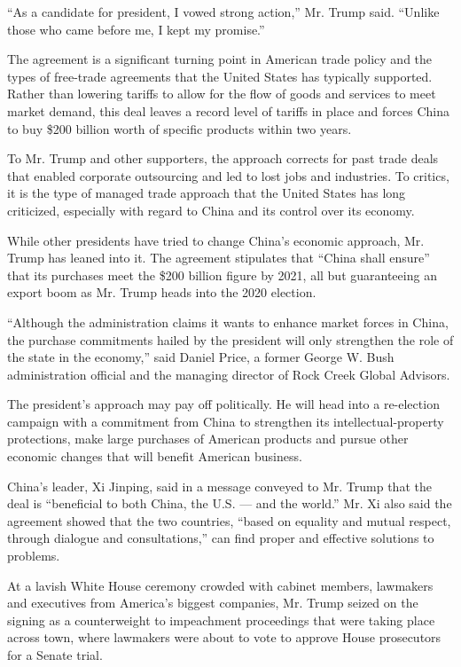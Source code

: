 ``As a candidate for president, I vowed strong action,'' Mr. Trump said.
``Unlike those who came before me, I kept my promise.''

The agreement is a significant turning point in American trade policy
and the types of free-trade agreements that the United States has
typically supported. Rather than lowering tariffs to allow for the flow
of goods and services to meet market demand, this deal leaves a record
level of tariffs in place and forces China to buy \$200 billion worth of
specific products within two years.

To Mr. Trump and other supporters, the approach corrects for past trade
deals that enabled corporate outsourcing and led to lost jobs and
industries. To critics, it is the type of managed trade approach that
the United States has long criticized, especially with regard to China
and its control over its economy.

While other presidents have tried to change China's economic approach,
Mr. Trump has leaned into it. The agreement stipulates that ``China
shall ensure'' that its purchases meet the \$200 billion figure by 2021,
all but guaranteeing an export boom as Mr. Trump heads into the 2020
election.

``Although the administration claims it wants to enhance market forces
in China, the purchase commitments hailed by the president will only
strengthen the role of the state in the economy,'' said Daniel Price, a
former George W. Bush administration official and the managing director
of Rock Creek Global Advisors.

The president's approach may pay off politically. He will head into a
re-election campaign with a commitment from China to strengthen its
intellectual-property protections, make large purchases of American
products and pursue other economic changes that will benefit American
business.

China's leader, Xi Jinping, said in a message conveyed to Mr. Trump that
the deal is ``beneficial to both China, the U.S. --- and the world.''
Mr. Xi also said the agreement showed that the two countries, ``based on
equality and mutual respect, through dialogue and consultations,'' can
find proper and effective solutions to problems.

At a lavish White House ceremony crowded with cabinet members, lawmakers
and executives from America's biggest companies, Mr. Trump seized on the
signing as a counterweight to impeachment proceedings that were taking
place across town, where lawmakers were about to vote to approve House
prosecutors for a Senate trial.

